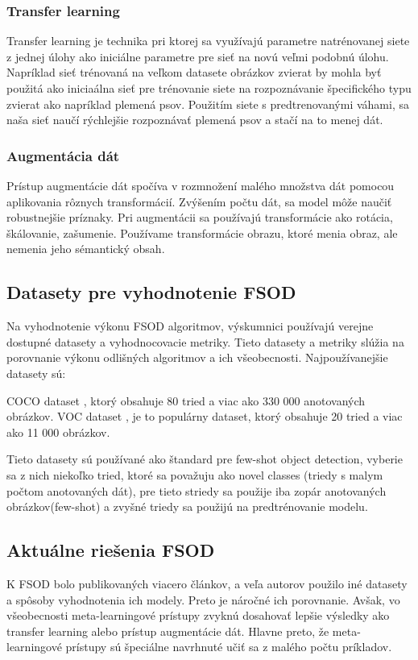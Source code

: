 \subsubsection{Transfer learning}
\hspace{\parindent}Transfer learning je technika pri ktorej sa využívajú parametre natrénovanej siete z jednej úlohy ako iniciálne parametre pre sieť na novú veľmi podobnú úlohu. Napríklad sieť trénovaná na veľkom datasete obrázkov zvierat by mohla byť použitá ako iniciaálna sieť pre trénovanie siete na rozpoznávanie špecifického typu zvierat ako napríklad plemená psov. Použitím siete s predtrenovanými váhami, sa naša sieť naučí rýchlejšie rozpoznávať plemená psov a stačí na to menej dát.

\subsubsection{Augmentácia dát}
\hspace{\parindent}Prístup augmentácie dát spočíva v rozmnožení malého množstva dát pomocou aplikovania rôznych transformácií. Zvýšením počtu dát, sa model môže naučiť robustnejšie príznaky. Pri augmentácii sa používajú transformácie ako rotácia, škálovanie, zašumenie. Používame transformácie obrazu, ktoré menia obraz, ale nemenia jeho sémantický obsah.

\subsection{Datasety pre vyhodnotenie FSOD}
\hspace{\parindent}Na vyhodnotenie výkonu FSOD algoritmov, výskumnici používajú verejne dostupné datasety a vyhodnocovacie metriky. Tieto datasety a metriky slúžia na porovnanie výkonu odlišných algoritmov a ich všeobecnosti. Najpoužívanejšie datasety sú: 

COCO dataset \cite{COCO}, ktorý obsahuje 80 tried a viac ako 330 000 anotovaných obrázkov. VOC dataset \cite{VOC}, je to populárny dataset, ktorý obsahuje 20 tried a viac ako 11 000 obrázkov. 

Tieto datasety sú používané ako štandard pre few-shot object detection, vyberie sa z nich niekoľko tried, ktoré sa považuju ako novel classes (triedy s malym počtom anotovaných dát), pre tieto striedy sa použije iba zopár anotovaných obrázkov(few-shot) a zvyšné triedy sa použijú na predtrénovanie modelu. 

\subsection{Aktuálne riešenia FSOD}
\hspace{\parindent}K FSOD bolo publikovaných viacero článkov, a veľa autorov použilo iné datasety a spôsoby vyhodnotenia ich modely. Preto je náročné ich porovnanie. Avšak, vo všeobecnosti meta-learningové prístupy zvyknú dosahovať lepšie výsledky ako transfer learning alebo prístup augmentácie dát. Hlavne preto, že meta-learningové prístupy sú špeciálne navrhnuté učiť sa z malého počtu príkladov. 


